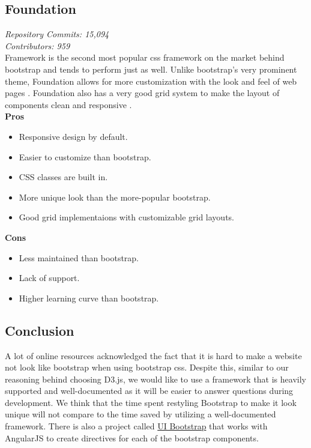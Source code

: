 \documentclass[onecolumn, draftclsnofoot,10pt, compsoc]{IEEEtran}
\begin{document}
\subsection{Foundation}
\textit{Repository Commits: 15,094}\\ 
\textit{Contributors: 959}\\
Framework is the second most popular css framework on the market behind bootstrap and tends to perform just as well. Unlike bootstrap's very prominent theme, Foundation allows for more customization with the look and feel of web pages \cite{Nick_Pettit}. Foundation also has a very good grid system to make the layout of components clean and responsive \cite{blankenship_2017}.\\ 
\textbf{Pros}
\begin{itemize}
    \item Responsive design by default.
    \item Easier to customize than bootstrap.
    \item CSS classes are built in. \cite{team_2015}
    \item More unique look than the more-popular bootstrap.
    \item Good grid implementaions with customizable grid layouts.
\end{itemize}
\textbf{Cons}
\begin{itemize}
    \item Less maintained than bootstrap.
    \item Lack of support.
    \item Higher learning curve than bootstrap.
\end{itemize}
\subsection{Conclusion}
A lot of online resources acknowledged the fact that it is hard to make a website not look like bootstrap when using bootstrap css. Despite this, similar to our reasoning behind choosing D3.js, we would like to use a framework that is heavily supported and well-documented as it will be easier to answer questions during development. We think that the time spent restyling Bootstrap to make it look unique will not compare to the time saved by utilizing a well-documented framework. There is also a project called \href{https://angular-ui.github.io/bootstrap/}{UI Bootstrap} that works with AngularJS to create directives for each of the bootstrap components. \cite{sevilayha_2015}


\end{document}
